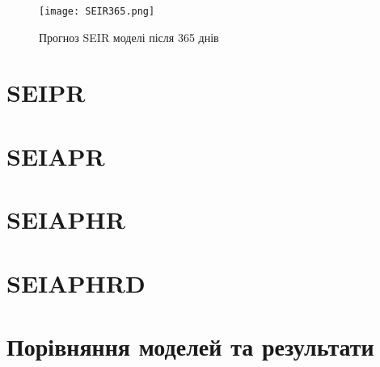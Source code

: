 \begin{figure}[H]
    \centering
    \texttt{[image: SEIR365.png]}
    \caption{Прогноз SEIR моделі після 365 днів}
    \label{fig:plot2}
\end{figure}
\section{SEIPR}
\section{SEIAPR}
\section{SEIAPHR}
\section{SEIAPHRD}
\section{Порівняння моделей та результати}